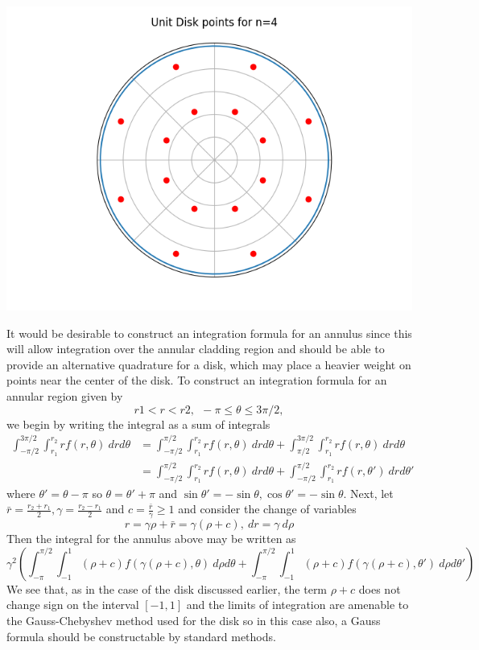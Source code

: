 \documentclass[10pt,a4paper]{letter}
\begin{document}
\includegraphics[scale=.5]{disk0_n4}

\pagebreak
It would be desirable to construct an integration formula for an annulus since this will allow integration over the annular cladding region and should be able to provide an alternative quadrature for a disk, which may place a heavier weight on points near the center of the disk.
To construct an integration formula for an annular region given by $$r1 < r < r2,\ \  -\pi \leq \theta \leq 3\pi/2,$$ we begin by writing the integral as a sum of integrals
\begin{align*}
\int_{-\pi/2}^{3\pi/2} \int_{r_1}^{r_2} r f(r,\theta)\ dr d\theta &= \int_{-\pi/2}^{\pi/2} \int_{r_1}^{r_2} r f(r,\theta)\ dr d\theta + \int_{\pi/2}^{3\pi/2} \int_{r_1}^{r_2} r f(r,\theta)\ dr d\theta\\
&= \int_{-\pi/2}^{\pi/2} \int_{r_1}^{r_2} r f(r,\theta)\ dr d\theta + \int_{-\pi/2}^{\pi/2} \int_{r_1}^{r_2} r f(r,\theta')\ dr d\theta'
\end{align*}
where $\theta' = \theta - \pi$ so $\theta = \theta'+\pi$ and $\sin\theta' = -\sin\theta, \cos\theta' = -\sin\theta$.  Next, let $\bar{r} = \frac{r_2+r_1}{2}, \gamma = \frac{r_2-r_1}{2}$ and $c = \frac{\bar{r}}{\gamma} \geq 1$ and consider the change of variables$$r = \gamma \rho + \bar{r} = \gamma(\rho + c),\ dr = \gamma\ d\rho$$
Then the integral for the annulus above may be written as 
$$\gamma^2\left(\int_{-\pi}^{\pi/2}\int_{-1}^1 (\rho + c) f(\gamma(\rho + c), \theta) \ d\rho d\theta +
\int_{-\pi}^{\pi/2}\int_{-1}^1 (\rho + c) f(\gamma(\rho + c), \theta') \ d\rho d\theta'\right)$$
We see that, as in the case of the disk discussed earlier, the term $\rho + c$ does not change sign on the interval $[-1,1]$ and the limits of integration are amenable to the Gauss-Chebyshev method used for the disk so in this case also, a Gauss formula should be constructable by standard methods.\\
\end{document}
